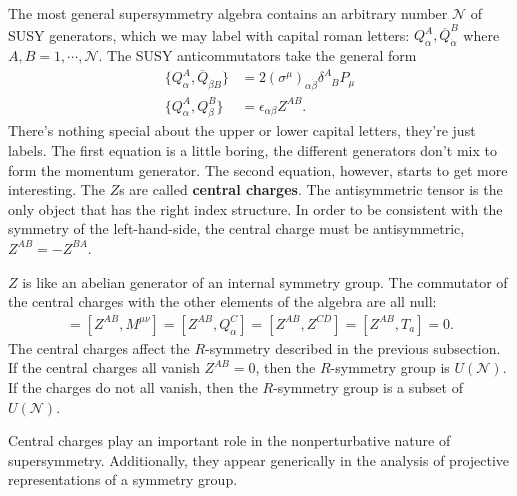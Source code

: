 \documentclass[12pt, oneside]{report}    %
\begin{document}
The most general supersymmetry algebra contains an arbitrary number $\mathcal N$ of SUSY generators, which we may label with capital roman letters: $Q^A_{\alpha},\overline Q^B_{\dot\alpha}$ where $A,B = 1,\cdots,\mathcal N$. The SUSY anticommutators take the general form
\begin{align}
    \{ Q^A_\alpha, \overline Q_{\dot\beta B}\} &= 2(\sigma^{\mu})_{\alpha\dot\beta} \delta^{A}_{\phantom AB}P_\mu\\
    \{ Q^A_\alpha, Q^B_\beta\} &= \epsilon_{\alpha\beta}Z^{AB}.
\end{align}
There's nothing special about the upper or lower capital letters, they're just labels. The first equation is a little boring, the different generators don't mix to form the momentum generator. The second equation, however, starts to get more interesting. The $Z$s are called \textbf{central charges}. The antisymmetric tensor is the only object that has the right index structure. In order to be consistent with the symmetry of the left-hand-side, the central charge must be antisymmetric, $Z^{AB} = -Z^{BA}$.

$Z$ is like an abelian generator of an internal symmetry group. The commutator of the central charges with the other elements of the algebra are all null:
\begin{align}
    [Z^{AB},P^\mu] = [Z^{AB},M^{\mu\nu}] = [Z^{AB}, Q^C_\alpha] = [Z^{AB},Z^{CD}] = [Z^{AB},T_a] = 0.
\end{align}
The central charges affect the $R$-symmetry described in the previous subsection. If the central charges all vanish $Z^{AB} = 0$, then the $R$-symmetry group is $U(\mathcal N)$. If the charges do not all vanish, then the $R$-symmetry group is a subset of $U(\mathcal N)$.

Central charges play an important role in the nonperturbative nature of supersymmetry. Additionally, they appear generically in the analysis of projective representations of a symmetry group.
\end{document}
